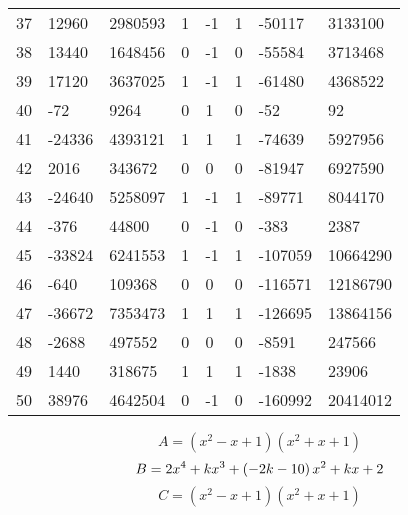 \documentclass{amsart}
\begin{document}
\begin{longtable}{|l|l|l|lllll|}
37&12960&2980593&1&-1&1&-50117&3133100\\
38&13440&1648456&0&-1&0&-55584&3713468\\
39&17120&3637025&1&-1&1&-61480&4368522\\
40&-72&9264&0&1&0&-52&92\\
41&-24336&4393121&1&1&1&-74639&5927956\\
42&2016&343672&0&0&0&-81947&6927590\\
43&-24640&5258097&1&-1&1&-89771&8044170\\
44&-376&44800&0&-1&0&-383&2387\\
45&-33824&6241553&1&-1&1&-107059&10664290\\
46&-640&109368&0&0&0&-116571&12186790\\
47&-36672&7353473&1&1&1&-126695&13864156\\
48&-2688&497552&0&0&0&-8591&247566\\
49&1440&318675&1&1&1&-1838&23906\\
50&38976&4642504&0&-1&0&-160992&20414012\\
\hline
\end{longtable}
$$A=(x^2
 - x
 + 1)(x^2
 + x
 + 1)$$
$$B=2\*x^4
 + k\*x^3
 + \left(-2\*k
 - 10\right) \*x^2
 + k\*x
 + 2$$
$$C=(x^2
 - x
 + 1)(x^2
 + x
 + 1)$$
\end{document}
